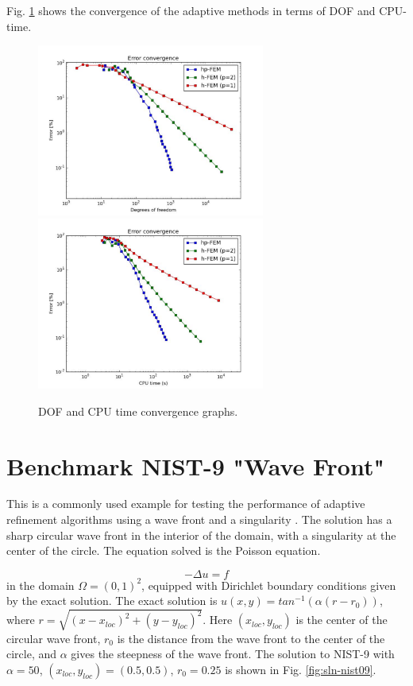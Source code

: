 \documentclass[12pt]{elsarticle}
\begin{document}
Fig. \ref{fig:nist-8-conv} shows the convergence of the adaptive methods in terms of DOF and CPU-time.

\begin{figure}[H]
\centering
\hspace{-50mm}
\includegraphics[width=7.5cm]{mafig51.pdf}\ \
\hspace{-10mm}
\includegraphics[width=7.5cm]{mafig52.pdf}
\hspace{-50mm}
\vspace{-2mm}
\caption{DOF and CPU time convergence graphs.}
\label{fig:nist-8-conv}
\end{figure}


\section{Benchmark NIST-9 "Wave Front"}
\label{sec:bench-9}

This is a commonly used example for testing the performance of
adaptive refinement algorithms using a wave front and a singularity \cite{mitchell-1, mitchell-2}.
The solution has a sharp circular wave front in the interior of the
domain, with a singularity at the center of the circle.
The equation solved is the Poisson equation.

\begin{equation} \label{wave-front}
-\Delta u = f
\end{equation}
in the domain $\Omega = (0, 1)^2$, equipped with Dirichlet boundary conditions
given by the exact solution. The exact solution is
$u(x, y) = tan^{-1}(\alpha (r - r_{0}))$,
where $r = \sqrt{(x - x_{loc})^{2} + (y - y_{loc})^{2}}$.
Here $(x_{loc}, y_{loc})$ is the center of the circular wave front,
$r_{0}$ is the distance from the wave front to the center of the circle,
and $\alpha$ gives the steepness of the wave front.
The solution to NIST-9 with $\alpha = 50$, $(x_{loc}, y_{loc}) = (0.5, 0.5)$,
$r_{0} = 0.25$ is shown in Fig. \ref{fig:sln-nist09}.
\end{document}
